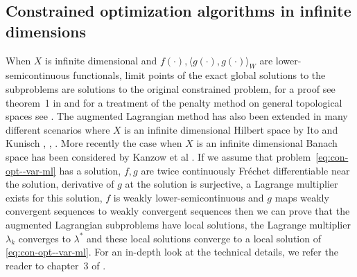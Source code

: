 \subsection{Constrained optimization algorithms in infinite dimensions} When $X$ is infinite dimensional and $f(\cdot),\langle g(\cdot), g(\cdot)\rangle_W$ are lower-semicontinuous functionals, limit points of the exact global solutions to the subproblems are solutions to the original constrained problem, for a proof see theorem~1 in \cite{dussault2007penalty} and for a treatment of the penalty method on general topological spaces see \cite{fiacco1969generalized}. The augmented Lagrangian method has also been extended in many different scenarios where $X$ is an infinite dimensional Hilbert space by Ito and Kunisch \cite{ito1990augmented}, \cite{ito1990augmentedvar}, \cite{ito2008lagrange}. More recently the case when $X$ is an infinite dimensional Banach space has been considered by Kanzow et al \cite{kanzow2018augmented}. If we assume that problem~\eqref{eq:con-opt--var-ml} has a solution, $f, g$ are twice continuously Fréchet differentiable near the solution, derivative of $g$ at the solution is surjective, a Lagrange multiplier exists for this solution, $f$ is weakly lower-semicontinuous and $g$ maps weakly convergent sequences to weakly convergent sequences then we can prove that the augmented Lagrangian subproblems have local solutions, the Lagrange multiplier $\lambda_k$ converges to $\lambda^*$ and these local solutions converge to a local solution of \eqref{eq:con-opt--var-ml}. For an in-depth look at the technical details, we refer the reader to chapter~3 of \cite{ito2008lagrange}. 

